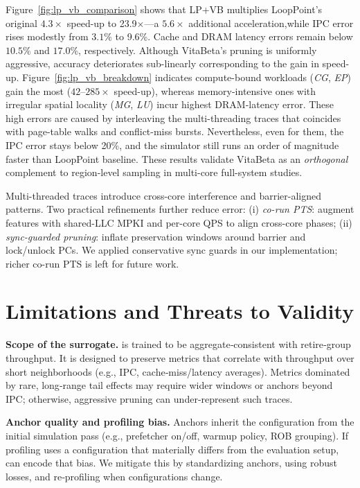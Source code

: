 Figure~\ref{fig:lp_vb_comparison} shows that \textsc{LP+VB} multiplies
LoopPoint’s original $4.3\times$ speed-up to {23.9$\times$}—a $5.6\times$ additional acceleration,while IPC error rises modestly from $3.1\%$ to {9.6\%}.  Cache and DRAM latency errors remain below $10.5\%$ and $17.0\%$,
respectively.  Although VitaBeta’s pruning is uniformly aggressive, accuracy deteriorates sub-linearly corresponding to the gain in speed-up. Figure~\ref{fig:lp_vb_breakdown} indicates compute-bound workloads
(\textit{CG}, \textit{EP}) gain the most ($42$–$285\times$ speed-up),
whereas memory-intensive ones with irregular spatial locality (\textit{MG}, \textit{LU}) incur 
highest DRAM-latency error.  These high errors are caused by interleaving the multi-threading traces that coincides with page-table walks and conflict-miss bursts. Nevertheless, even for them, the IPC error stays below 20\%, and the simulator still runs an order of magnitude faster than  LoopPoint baseline. 
These results validate VitaBeta as an \emph{orthogonal}
complement to region-level sampling in multi-core full-system studies.  

Multi-threaded traces introduce cross-core interference and barrier-aligned patterns. Two practical refinements further reduce error: (i) \emph{co-run PTS}: augment features with shared-LLC MPKI and per-core QPS to align cross-core phases; (ii) \emph{sync-guarded pruning}: inflate preservation windows around barrier and lock/unlock PCs. We applied conservative sync guards in our implementation; richer co-run PTS is left for future work.

\section{Limitations and Threats to Validity}\label{sec:limitations}
\textbf{Scope of the surrogate.} \pts is trained to be aggregate‑consistent with retire‑group throughput. It is designed to preserve metrics that correlate with throughput over short neighborhoods (e.g., IPC, cache‑miss/latency averages). Metrics dominated by rare, long‑range tail effects may require wider windows or anchors beyond IPC; otherwise, aggressive pruning can under‑represent such traces.

\textbf{Anchor quality and profiling bias.} Anchors inherit the configuration from the initial simulation pass (e.g., prefetcher on/off, warmup policy, ROB grouping). If profiling uses a configuration that materially differs from the evaluation setup, \pts can encode that bias. We mitigate this by standardizing anchors, using robust losses, and re‑profiling when configurations change.

